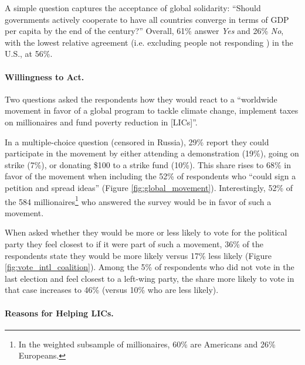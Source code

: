 \documentclass[12pt,english]{article}
\begin{document}
\begin{bibunit}
A simple question captures the acceptance of global solidarity: ``Should governments actively cooperate to have all countries converge in terms of GDP per capita by the end of the century?'' Overall, 61\% answer \textit{Yes} and 26\% \textit{No}, with the lowest relative agreement (i.e. excluding people not responding%
) in the U.S., at 56\%.

\paragraph{Willingness to Act.}\label{par:willingness_act}

Two questions asked the respondents how they would react to a ``worldwide movement in favor of a global program to tackle climate change, implement taxes on millionaires and fund poverty reduction in [LICs]''. 

In a multiple-choice question (censored in Russia), 29\% report they could participate in the movement by either attending a demonstration (19\%), going on strike (7\%), or donating \$100 to a strike fund (10\%). This share rises to 68\% in favor of the movement when including the 52\% of respondents who ``could sign a petition and spread ideas'' (Figure \ref{fig:global_movement}). 
Interestingly, 52\% of the 584 millionaires\footnote{In the weighted subsample of millionaires, 60\% are Americans and 26\% Europeans.} who answered the survey would be in favor of such a movement.

When asked whether they would be more or less likely to vote for the political party they feel closest to if it were part of such a movement, 36\% of the respondents state they would be more likely versus 17\% less likely (Figure \ref{fig:vote_intl_coalition}). Among the 5\% of respondents who did not vote in the last election and feel closest to a left-wing party, the share more likely to vote in that case increases to 46\% (versus 10\% who are less likely). 

\paragraph{Reasons for Helping LICs.}\label{par:why_help_lic}


\end{bibunit}
\end{document}
